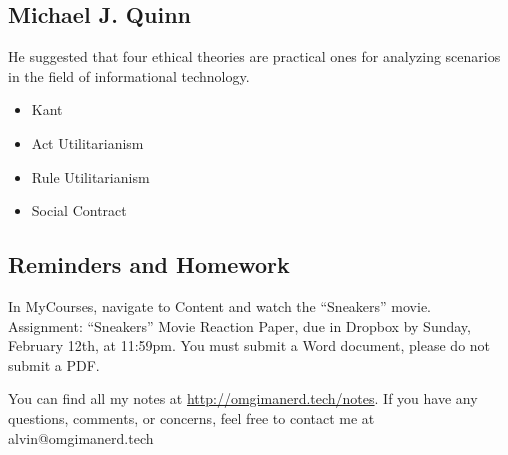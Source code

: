 \documentclass[letterpaper, 12pt]{article}
\begin{document}
\subsection*{Michael J. Quinn}
He suggested that four ethical theories are practical ones for analyzing
scenarios in the field of informational technology.
\begin{itemize}
  \item Kant
  \item Act Utilitarianism
  \item Rule Utilitarianism
  \item Social Contract
\end{itemize}

\subsection*{Reminders and Homework}
In MyCourses, navigate to Content and watch the ``Sneakers'' movie. \\
Assignment: ``Sneakers'' Movie Reaction Paper, due in Dropbox by Sunday,
February 12th, at 11:59pm.
You must submit a Word document, please do not submit a PDF.

\begin{center}
  You can find all my notes at \url{http://omgimanerd.tech/notes}. If you have
  any questions, comments, or concerns, feel free to contact me at
  alvin@omgimanerd.tech
\end{center}
\end{document}
